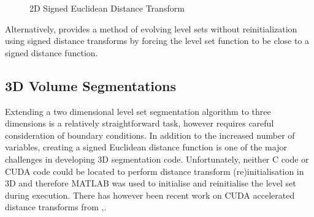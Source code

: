 	\begin{figure}
	  \begin{center}
	  \end{center}
	  \caption{2D Signed Euclidean Distance Transform}
	  \label{fig:sdfexplanation}
	\end{figure}
	
Alternatively, \cite{gui2005lse} provides a method of evolving level sets without reinitialization using signed distance transforms by forcing the level set function to be close to a signed distance function.

	\subsection{3D Volume Segmentations}\label{3dvolumesegmentation}
Extending a two dimensional level set segmentation algorithm to three dimensions is a relatively straightforward task, however requires careful consideration of boundary conditions. In addition to the increased number of variables, creating a signed Euclidean distance function is one of the major challenges in developing 3D segmentation code. Unfortunately, neither C code or CUDA code could be located to perform distance transform (re)initialisation in 3D and therefore MATLAB was used to initialise and reinitialise the level set during execution. There has however been recent work on CUDA accelerated distance transforms from \cite{difi},\cite{gpgpudistance}.
